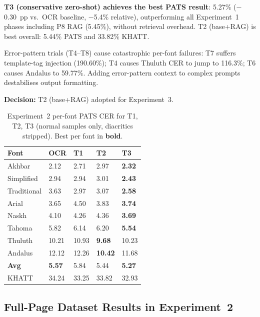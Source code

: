 \textbf{T3 (conservative zero-shot) achieves the best PATS result}: 5.27\%
($-$0.30~pp vs.\ OCR baseline, $-$5.4\% relative), outperforming all
Experiment~1 phases including P8 RAG (5.45\%), without retrieval overhead.
T2 (base+RAG) is best overall: 5.44\% PATS and 33.82\% KHATT.

Error-pattern trials (T4--T8) cause catastrophic per-font failures:
T7 suffers template-tag injection (190.60\%); T4 causes Thuluth CER to
jump to 116.3\%; T6 causes Andalus to 59.77\%. Adding error-pattern
context to complex prompts destabilises output formatting.

\textbf{Decision:} T2 (base+RAG) adopted for Experiment~3.

\begin{table}[htbp]
  \centering
  \caption{Experiment~2 per-font PATS CER for T1, T2, T3 (normal samples
           only, diacritics stripped). Best per font in \textbf{bold}.}
  \label{tab:exp2_pats_per_font}
  \begin{tabularx}{\textwidth}{lXXXX}
    \toprule
    \textbf{Font} & \textbf{OCR} & \textbf{T1} & \textbf{T2} & \textbf{T3} \\
    \midrule
    Akhbar       &  2.12 & 2.71 & 2.97 & \textbf{2.32} \\
    Simplified   &  2.94 & 2.94 & 3.01 & \textbf{2.43} \\
    Traditional  &  3.63 & 2.97 & 3.07 & \textbf{2.58} \\
    Arial        &  3.65 & 4.50 & 3.83 & \textbf{3.74} \\
    Naskh        &  4.10 & 4.26 & 4.36 & \textbf{3.69} \\
    Tahoma       &  5.82 & 6.14 & 6.20 & \textbf{5.54} \\
    Thuluth      & 10.21 & 10.93 & \textbf{9.68} & 10.23 \\
    Andalus      & 12.12 & 12.26 & \textbf{10.42} & 11.68 \\
    \midrule
    \textbf{Avg} & \textbf{5.57} & 5.84 & 5.44 & \textbf{5.27} \\
    KHATT        & 34.24 & 33.25 & 33.82 & 32.93 \\
    \bottomrule
  \end{tabularx}
\end{table}

\subsection{Full-Page Dataset Results in Experiment~2}
\label{subsec:res_exp2_fullpage}

